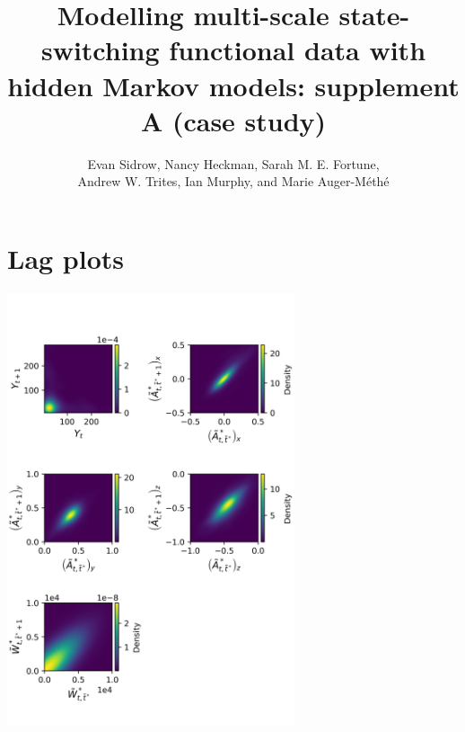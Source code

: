 \documentclass{article}
\begin{document}



\title{Modelling multi-scale state-switching functional data with hidden Markov models: supplement A (case study)}
\date{}
\author{Evan Sidrow, Nancy Heckman, Sarah M. E. Fortune, \\ Andrew W. Trites, Ian Murphy, and Marie Auger-M\'eth\'e}


\maketitle

\addtocounter{tablenum}{1}
\addtocounter{fignum}{1}

    \section{Lag plots}
        
        \begin{center}
        \includegraphics[height=5in]{../Plots/2019/20190902-182840-CATs_OB_1_0_267_CarHHMM2_lagplot.png}
        \end{center}
        
\end{document}
